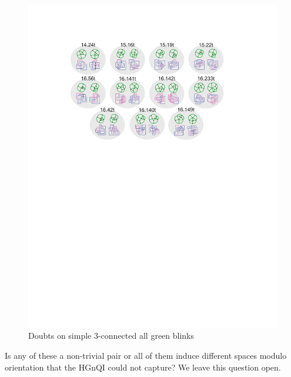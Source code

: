 \begin{figure}[htp]
   \begin{center}
      \leavevmode
      \includegraphics{fig/doubts3ConnectedIsolated.pdf}
   \end{center}
   \vspace{-0.7cm}
   \caption{ Doubts on simple 3-connected all green blinks}
   \label{fig:doubts3ConnectedIsolated}
\end{figure}

Is any of these a non-trivial pair or all of them induce different spaces
modulo orientation that the HGnQI could not capture? We leave this question
open.
